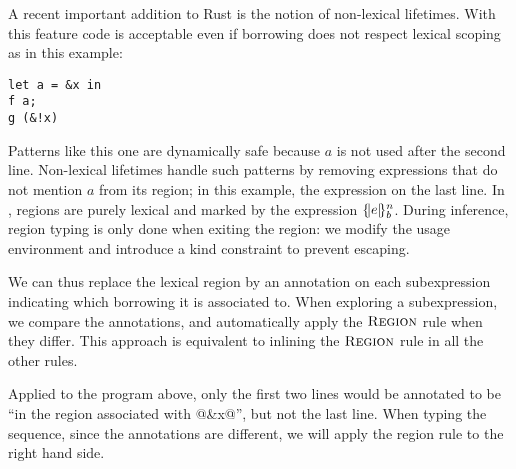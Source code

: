 A recent important addition to Rust is the notion of non-lexical lifetimes.
With this feature code is acceptable even if borrowing does not respect
lexical scoping as in this example:

\begin{lstlisting}
let a = &x in
f a;
g (&!x)
\end{lstlisting}

Patterns like this one are dynamically safe because $a$ is not used after
the second line.
Non-lexical lifetimes handle such patterns by removing expressions
that do not mention $a$ from its region; in this example,  the
expression on the last line.
%
In \lang, regions are purely lexical and marked by the
expression $\region{b}{e}$.
During inference, region typing is only done when exiting the region:
we modify the usage environment and introduce a kind constraint to prevent
escaping.

We can thus replace the lexical region by
an annotation on each subexpression indicating which borrowing it is associated
to. When exploring a subexpression, we compare the annotations, and automatically
apply the $\textsc{Region}$ rule when they differ.
%
This approach is equivalent to inlining the $\textsc{Region}$ rule in all the other
rules.

Applied to the program above, only the first two lines would be annotated
to be ``in the region associated with @&x@'', but not the last line.
When typing the sequence, since the annotations are different, we will apply
the region rule to the right hand side.

\lstDeleteShortInline@

